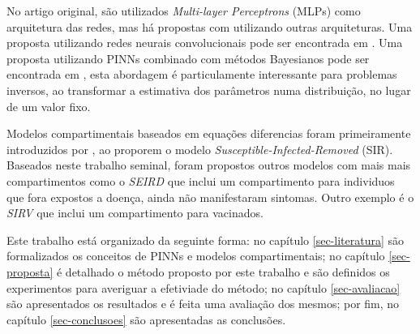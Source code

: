 No artigo original, são utilizados \textit{Multi-layer Perceptrons} (MLPs)
como arquitetura das redes, mas há propostas com utilizando outras arquiteturas.
Uma proposta utilizando redes neurais convolucionais pode ser encontrada em 
\cite{shi-etal:24-convnet}. Uma proposta utilizando PINNs combinado com 
métodos Bayesianos pode ser encontrada em \cite{yang:21-bpinns}, esta 
abordagem é particulamente interessante para problemas inversos, ao transformar
a estimativa dos parâmetros numa distribuição, no lugar de um valor fixo.

Modelos compartimentais baseados em equações diferencias foram primeiramente 
introduzidos por \cite{kermack-mcKendrick:1927}, ao proporem o modelo 
\textit{Susceptible-Infected-Removed} (SIR). Baseados neste trabalho seminal,
foram propostos outros modelos com mais mais compartimentos como o 
\textit{SEIRD} \cite{giles:77-sird} que inclui um compartimento para individuos
que fora expostos a doença, ainda não manifestaram sintomas. Outro exemplo é o
\textit{SIRV} \cite{schlickeiser-kroger:21-sirv} que inclui um compartimento
para vacinados.

Este trabalho está organizado da seguinte forma: no capítulo \ref{sec-literatura} 
são formalizados os conceitos de PINNs e modelos compartimentais; 
no capítulo \ref{sec-proposta} é detalhado o método proposto por este 
trabalho e são definidos os experimentos para averiguar a efetiviade
do método; no capítulo \ref{sec-avaliacao} são apresentados os resultados e 
é feita uma avaliação dos mesmos; por fim, no capítulo \ref{sec-conclusoes} são
apresentadas as conclusões.    